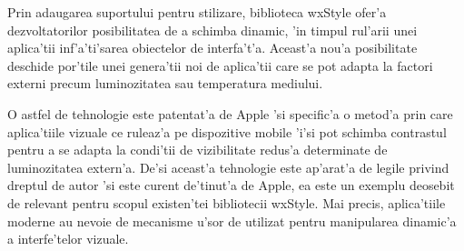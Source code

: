 Prin adaugarea suportului pentru stilizare, biblioteca wxStyle ofer'a dezvoltatorilor posibilitatea de a schimba dinamic, 'in timpul rul'arii unei aplica'tii inf'a'ti'sarea obiectelor de interfa't'a. Aceast'a nou'a posibilitate deschide por'tile unei genera'tii noi de aplica'tii care se pot adapta la factori externi precum luminozitatea sau temperatura mediului.

\medskip

O astfel de tehnologie este patentat'a de Apple\cite{uicontrast} 'si specific'a o metod'a prin care aplica'tiile vizuale ce ruleaz'a pe dispozitive mobile 'i'si pot schimba contrastul pentru a se adapta la condi'tii de vizibilitate redus'a determinate de luminozitatea extern'a. De'si aceast'a tehnologie este ap'arat'a de legile privind dreptul de autor 'si este curent de'tinut'a de Apple, ea este un exemplu deosebit de relevant pentru scopul existen'tei bibliotecii wxStyle. Mai precis, aplica'tiile moderne au nevoie de mecanisme u'sor de utilizat pentru manipularea dinamic'a a interfe'telor vizuale.